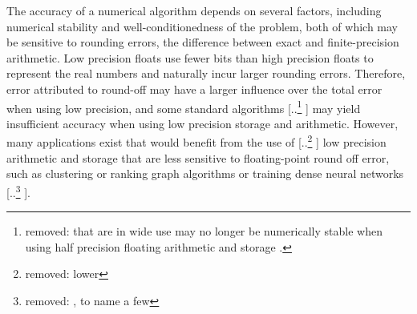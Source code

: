 \documentclass[review,onefignum,onetabnum]{siamart190516}
\providecommand{\DIFadd}[1]{{\protect\color{blue} \sf #1}} %
\providecommand{\DIFdel}[1]{{\protect\color{red} [..\footnote{removed: #1} ]}} %
\providecommand{\DIFaddbegin}{} %
\providecommand{\DIFaddend}{} %
\providecommand{\DIFdelbegin}{} %
\providecommand{\DIFdelend}{} %
\begin{document}
\DIFaddend The accuracy of a numerical algorithm depends on several factors, including numerical stability and well-conditionedness of the problem, both of which may be sensitive to rounding errors, the difference between exact and finite-precision arithmetic. 
Low precision floats use fewer bits than high precision floats to represent the real numbers and naturally incur larger rounding errors. 
Therefore, error attributed to round-off may have a larger influence over the total error when using low precision, and some standard algorithms \DIFdelbegin \DIFdel{that are in wide use may no longer be numerically stable when using half precision floating arithmetic and storage . 
}\DIFdelend \DIFaddbegin \DIFadd{may yield insufficient accuracy when using low precision storage and arithmetic.
}\DIFaddend However, many applications exist that would benefit from the use of \DIFdelbegin \DIFdel{lower }\DIFdelend \DIFaddbegin \DIFadd{low }\DIFaddend precision arithmetic and storage that are less sensitive to floating-point round off error, such as clustering or ranking graph algorithms \cite{vonLuxburg2007} or training dense neural networks \cite{micikevicius2018mixed}\DIFdelbegin \DIFdel{, to name a few}\DIFdelend .\par
\end{document}
